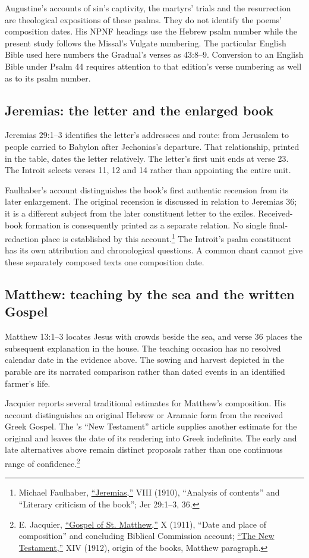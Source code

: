 Augustine's accounts of sin's captivity, the martyrs' trials and the
resurrection are theological expositions of these psalms. They do not
identify the poems' composition dates. His NPNF headings use the
Hebrew psalm number while the present study follows the Missal's
Vulgate numbering. The particular English Bible used here numbers the
Gradual's verses as 43:8--9. Conversion to an English Bible under
Psalm 44 requires attention to that edition's verse numbering as well
as to its psalm number.

\subsection{Jeremias: the letter and the enlarged book}
\label{hist-jeremias}
Jeremias 29:1--3 identifies the letter's addressees and route: from
Jerusalem to people carried to Babylon after Jechonias's departure.
That relationship, printed in the table, dates the letter relatively.
The letter's first unit ends at verse 23. The Introit selects verses
11, 12 and 14 rather than appointing the entire unit.

Faulhaber's account distinguishes the book's first authentic recension
from its later enlargement. The original recension is discussed in
relation to Jeremias 36; it is a different subject from the later
constituent letter to the exiles. Received-book formation is consequently
printed as a separate relation. No single final-redaction place is
established by this account.\footnote{Michael Faulhaber,
\href{https://www.newadvent.org/cathen/08334a.htm}{``Jeremias,''}
 VIII (1910), ``Analysis of contents'' and
``Literary criticism of the book''; Jer 29:1--3, 36.}
The Introit's psalm constituent has its own attribution and chronological
questions. A common chant cannot give these separately composed texts
one composition date.

\subsection{Matthew: teaching by the sea and the written Gospel}
\label{hist-matthew}
Matthew 13:1--3 locates Jesus with crowds beside the sea, and verse 36
places the subsequent explanation in the house. The teaching occasion
has no resolved calendar date in the evidence above. The sowing and
harvest depicted in the parable are its narrated comparison rather
than dated events in an identified farmer's life.

Jacquier reports several traditional estimates for Matthew's composition.
His account distinguishes an original Hebrew or Aramaic form from
the received Greek Gospel. The 's ``New
Testament'' article supplies another estimate for the original and
leaves the date of its rendering into Greek indefinite. The early
and late alternatives above remain distinct proposals rather than
one continuous range of confidence.\footnote{E. Jacquier,
\href{https://www.newadvent.org/cathen/10057a.htm}{``Gospel of St.
Matthew,''}  X (1911), ``Date and place
of composition'' and concluding Biblical Commission account;
\href{https://www.newadvent.org/cathen/14530a.htm}{``The New Testament,''}
XIV (1912), origin of the books, Matthew paragraph.}

